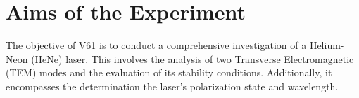 \section{Aims of the Experiment}

The objective of V61 is to conduct a comprehensive investigation 
of a Helium-Neon (HeNe) laser. This involves the analysis of two 
Transverse Electromagnetic (TEM) modes and the evaluation of its 
stability conditions. Additionally, it encompasses the determination
the laser's polarization state and wavelength.